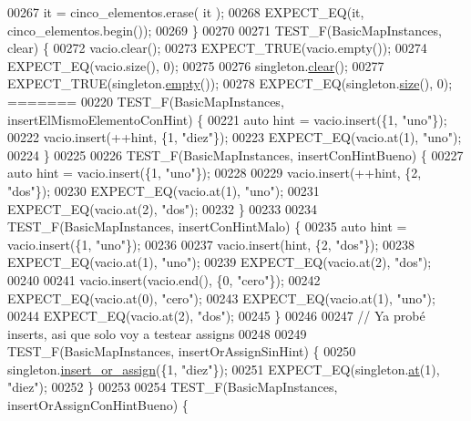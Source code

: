 \begin{DoxyCode}
00267     it = cinco\_elementos.erase( it );
00268     EXPECT\_EQ(it, cinco\_elementos.begin());
00269 \}
00270 
00271 TEST\_F(BasicMapInstances, clear) \{
00272     vacio.clear();
00273     EXPECT\_TRUE(vacio.empty());
00274     EXPECT\_EQ(vacio.size(), 0);
00275 
00276     singleton.\hyperlink{classaed2_1_1map_a2bfa5165825979bf2431db55bc6bc9ca_a2bfa5165825979bf2431db55bc6bc9ca}{clear}();
00277     EXPECT\_TRUE(singleton.\hyperlink{classaed2_1_1map_af5320ca0a7df4d16015441d5d055a7ee_af5320ca0a7df4d16015441d5d055a7ee}{empty}());
00278     EXPECT\_EQ(singleton.\hyperlink{classaed2_1_1map_a89f2613f926ac13293eafe65889d6021_a89f2613f926ac13293eafe65889d6021}{size}(), 0);
=======
00220 TEST\_F(BasicMapInstances, insertElMismoElementoConHint) \{
00221     \textcolor{keyword}{auto} hint = vacio.insert(\{1, \textcolor{stringliteral}{"uno"}\});
00222     vacio.insert(++hint, \{1, \textcolor{stringliteral}{"diez"}\});
00223     EXPECT\_EQ(vacio.at(1), \textcolor{stringliteral}{"uno"});
00224 \}
00225 
00226 TEST\_F(BasicMapInstances, insertConHintBueno) \{
00227     \textcolor{keyword}{auto} hint = vacio.insert(\{1, \textcolor{stringliteral}{"uno"}\});
00228 
00229     vacio.insert(++hint, \{2, \textcolor{stringliteral}{"dos"}\});
00230     EXPECT\_EQ(vacio.at(1), \textcolor{stringliteral}{"uno"});
00231     EXPECT\_EQ(vacio.at(2), \textcolor{stringliteral}{"dos"});
00232 \}
00233 
00234 TEST\_F(BasicMapInstances, insertConHintMalo) \{
00235     \textcolor{keyword}{auto} hint = vacio.insert(\{1, \textcolor{stringliteral}{"uno"}\});
00236 
00237     vacio.insert(hint, \{2, \textcolor{stringliteral}{"dos"}\});
00238     EXPECT\_EQ(vacio.at(1), \textcolor{stringliteral}{"uno"});
00239     EXPECT\_EQ(vacio.at(2), \textcolor{stringliteral}{"dos"});
00240 
00241     vacio.insert(vacio.end(), \{0, \textcolor{stringliteral}{"cero"}\});
00242     EXPECT\_EQ(vacio.at(0), \textcolor{stringliteral}{"cero"});
00243     EXPECT\_EQ(vacio.at(1), \textcolor{stringliteral}{"uno"});
00244     EXPECT\_EQ(vacio.at(2), \textcolor{stringliteral}{"dos"});
00245 \}
00246 
00247 \textcolor{comment}{// Ya probé inserts, asi que solo voy a testear assigns}
00248 
00249 TEST\_F(BasicMapInstances, insertOrAssignSinHint) \{
00250     singleton.\hyperlink{classaed2_1_1map_a2ef6723c183916276b0afc4a4c721475_a2ef6723c183916276b0afc4a4c721475}{insert\_or\_assign}(\{1, \textcolor{stringliteral}{"diez"}\});
00251     EXPECT\_EQ(singleton.\hyperlink{classaed2_1_1map_a579c9179b42175c23a1013ac7f1b876c_a579c9179b42175c23a1013ac7f1b876c}{at}(1), \textcolor{stringliteral}{"diez"});
00252 \}
00253 
00254 TEST\_F(BasicMapInstances, insertOrAssignConHintBueno) \{

\end{DoxyCode}
